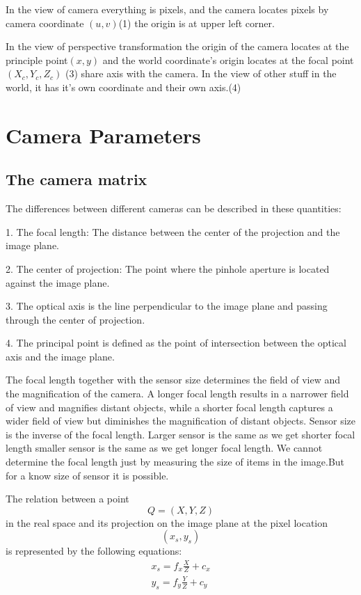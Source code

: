 \documentclass{article}
\begin{document}
In the view of camera everything is pixels, and the camera locates pixels by camera coordinate $(u,v)$(1) the origin is at upper left corner.

In the view of perspective transformation the origin of the camera locates at the principle
point$(x,y)$ and the world coordinate's origin locates at the focal point$(X_c,Y_c,Z_c)$ (3) share axis with the camera.
In the view of other stuff in the world, it has it's own coordinate and their own axis.(4)
\section{Camera Parameters}
\subsection[short]{The camera matrix}
The differences between different cameras can be described in these quantities:  

1. The focal length: The distance between the center of the projection and the image plane.

2. The center of projection: The point where the pinhole aperture is located against the image plane.

3. The optical axis is the line perpendicular to the image plane and passing through the center of projection.

4. The principal point is defined as the point of intersection between the optical axis and the image plane.

The focal length together with the sensor size determines the field of view and the magnification of the camera. A longer focal length results in a narrower field of view and magnifies distant objects, while a shorter focal length captures a wider field of view but diminishes the magnification of distant objects. Sensor size is the inverse of the focal length. Larger sensor is the same as we get shorter focal length smaller sensor is the same as we get longer focal length. We cannot determine the focal length just by measuring the size of items in the image.But for a know size of sensor it is possible.

The relation between a point \begin{equation}
    Q=(X, Y, Z)
\end{equation}in the real space and its projection on the image plane at the pixel location \begin{equation}
    (x_s, y_s)
\end{equation} is represented by the following equations:
\begin{eqnarray}
    x_s=f_x\frac{X}{Z}+c_x \\
    y_s=f_y\frac{Y}{Z}+c_y
\end{eqnarray}
\end{document}

